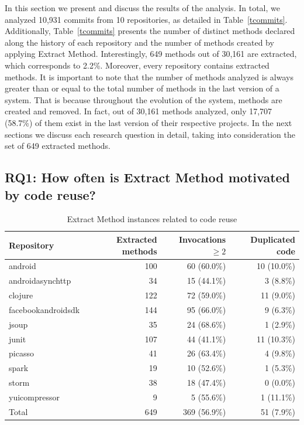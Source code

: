 In this section we present and discuss the results of the analysis. In total, we analyzed 10,931 commits from 10 repositories, as detailed in Table~\ref{tcommits}.
Additionally, Table~\ref{tcommits} presents the number of distinct methods declared along the history of each repository and the number of methods created by applying Extract Method.
Interestingly, 649 methods out of 30,161 are extracted, which corresponds to 2.2\%. Moreover, every repository contains extracted methods.
It is important to note that the number of methods analyzed is always greater than or equal to the total number of methods in the last version of a system. That is because throughout the evolution of the system, methods are created and removed. In fact, out of 30,161 methods analyzed, only 17,707 (58.7\%) of them exist in the last version of their respective projects.
In the next sections we discuss each research question in detail, taking into consideration the set of 649 extracted methods.

\subsection{RQ1: How often is Extract Method motivated by code reuse?}
\label{study1:rq1}

\begin{table}[b]\centering
\renewcommand{\arraystretch}{1.3}
\caption{Extract Method instances related to code reuse}
\begin{tabular}{@{}lrrr@{}}\toprule
Repository & Extracted methods & Invocations $\geq 2$ & Duplicated code\\
\midrule
android & 100 & 60 (60.0\%) & 10 (10.0\%) \\
android\-async\-http & 34 & 15 (44.1\%) & 3 (8.8\%) \\
clojure & 122 & 72 (59.0\%) & 11 (9.0\%) \\
facebook\-android\-sdk & 144 & 95 (66.0\%) & 9 (6.3\%) \\
jsoup & 35 & 24 (68.6\%) & 1 (2.9\%) \\
junit & 107 & 44 (41.1\%) & 11 (10.3\%) \\
picasso & 41 & 26 (63.4\%) & 4 (9.8\%) \\
spark & 19 & 10 (52.6\%) & 1 (5.3\%) \\
storm & 38 & 18 (47.4\%) & 0 (0.0\%) \\
yuicompressor & 9 & 5 (55.6\%) & 1 (11.1\%) \\
\midrule
Total & 649 & 369 (56.9\%) & 51 (7.9\%) \\
\bottomrule
\end{tabular}
\label{treuse}
\end{table}


